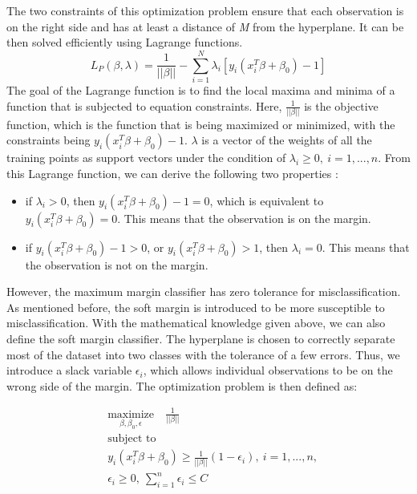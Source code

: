 The two constraints of this optimization problem ensure that each observation is on the right side
and has at least a distance of \emph{M} from the hyperplane. It can be then solved efficiently using
Lagrange functions.
\begin{equation}
    L_P(\beta, \lambda) = \frac 1 {||\beta||} - \sum_{i=1}^N \lambda_i [ y_i (x_i^T \beta + \beta_0) - 1 ]
\end{equation}
The goal of the Lagrange function is to find the local maxima and minima of a function
that is subjected to equation constraints.
Here, $\frac 1 {||\beta||}$ is the objective function, which is the function that is being 
maximized or minimized, with the constraints being
$y_i(x_i^T \beta + \beta_0) - 1$. $\lambda$ is a vector of the weights of all the training points as support vectors
under the condition of $\lambda_i \geq 0,\ i = 1, ..., n$. From this Lagrange function, we can
derive the following two properties \cite{Elements4}:
\begin{itemize}
    \item if $\lambda_i > 0$, then $y_i(x_i^T\beta + \beta_0) - 1 = 0$, which is equivalent to
    $y_i(x_i^T\beta + \beta_0) = 0$. This means that the observation is on the margin.
    \item if $y_i(x_i^T\beta + \beta_0) - 1 > 0$, or $y_i(x_i^T\beta + \beta_0) > 1$, then
    $\lambda_i = 0$. This means that the observation is not on the margin.
  \end{itemize}




However, the maximum margin classifier has zero tolerance for misclassification. As mentioned before,
the soft margin is introduced to be more susceptible to misclassification. With the mathematical knowledge
given above, we can also define the soft margin classifier. The hyperplane
is chosen to correctly separate most of the dataset into two classes with the tolerance of a few errors.
Thus, we introduce a slack variable $\epsilon_i$, which allows individual observations to be on the wrong side 
of the margin.
The optimization problem is then defined as\cite{R9}:

\begin{equation}
    \begin{aligned}
      & \underset{\textstyle {\beta, \beta_0, \epsilon}}{\text{maximize}} \quad
        \frac 1 {||\beta||} \\
      & \text{subject to} \\
      & y_i(x_i^T \beta + \beta_0) \geq \frac{1}{||\beta||}(1-\epsilon_i),\ i = 1, ..., n, \\
      & \epsilon_i \geq 0, \ \sum_{i=1}^n \epsilon_i \leq C
    \end{aligned}
\end{equation}

